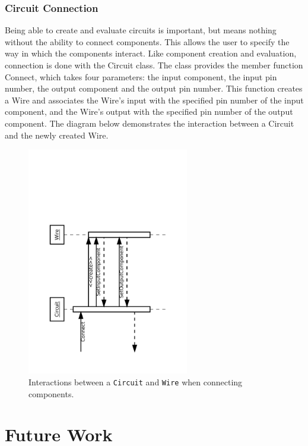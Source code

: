 \documentclass{article}
\newcommand{\ClassName}[1]{\texttt{#1}}
\begin{document}
\subsubsection{Circuit Connection}

Being able to create and evaluate circuits is important, but means nothing without the ability to connect components. This allows the user to specify the way in which the components interact. Like component creation and evaluation, connection is done with the Circuit class. The class provides the member function Connect, which takes four parameters: the input component, the input pin number, the output component and the output pin number. This function creates a Wire and associates the Wire’s input with the specified pin number of the input component, and the Wire’s output with the specified pin number of the output component. The diagram below demonstrates the interaction between a Circuit and the newly created Wire.

\begin{figure}[H]
    \begin{center}
        \includegraphics[angle=270,width=200pt]{imgs/ComponentConnectionInteraction.pdf}
    \end{center}
    \caption{Interactions between a \ClassName{Circuit} and \ClassName{Wire} when connecting components.}
\end{figure}

\section{Future Work}
\end{document}

